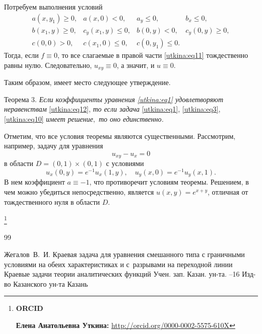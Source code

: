 {Потребуем выполнения условий
\begin{equation}
\label{utkina:eq12}
\begin{array}{llll}
a(x,y_1 ) \ge 0, &
a(x, 0) < 0, &
a_y \le 0, &
b_x \le 0, \\
b(x_1 ,y) \ge 0, & 
c_y (x_1 ,y) \le 0, &
b(0,y) < 0, &
c_y (0,y) \ge 0, \\
c(0, 0) > 0, &
c(x_1 , 0) \le 0, &
c(0,y_1 ) \le 0.
\end{array}
\end{equation}
Тогда, если $f \equiv 0$, то все слагаемые в правой части \eqref{utkina:eq11} тождественно
равны нулю. Следовательно, $u_{xy} \equiv 0$, а значит, и $u \equiv 0$.

Таким образом, имеет место следующее утверждение.

\smallskip

{\small \sc Теорема 3.} \textit{Если коэффициенты уравнения \eqref{utkina:eq1} удовлетворяют неравенствам}
\eqref{utkina:eq12}, \textit{то если задача} \eqref{utkina:eq1}, \eqref{utkina:eq3}, \eqref{utkina:eq10} {\it  имеет решение$,$ то оно единственно.}

\smallskip

Отметим, что все условия теоремы являются существенными. 
Рассмотрим, например, задачу для уравнения 
$$u_{xy} - u_x = 0$$ в области $D = (0, 1)\times (0, 1)$ с условиями 
$$u_x ( 0, y) = e^{ - 1}u_x ( 1, y), \quad 
u_y (x, 0) = e^{ - 1}u_y ( x, 1).$$ 
В нем коэффициент $a \equiv - 1$, что противоречит условиям теоремы. 
Решением, в чем можно убедиться непосредственно, является $u(x, y) = e^{x + y}$, отличная от
тождественного нуля в области $D$.


\smallskip


\thanks{{\bf ORCID}

{\bf Елена Анатольевна Уткина:} \url{http://orcid.org/0000-0002-5575-610X}


}

\RusRef


\begin{thebibliography}{99}

\by Жегалов~В.~И.
\paper Краевая задача для уравнения смешанного типа с граничными условиями на обеих характеристиках и с~разрывами на переходной линии
\inbook Краевые задачи теории аналитических функций
\serial Учен. зап. Казан. ун-та.
--16
\publ Изд-во Казанского ун-та
\publaddr Казань



\end{thebibliography}}
